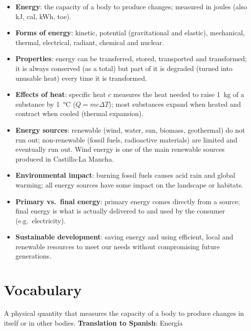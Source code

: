 \begin{itemize}
    \item \textbf{Energy}: the capacity of a body to produce changes; measured in joules (also kJ, cal, kWh, toe).
    \item \textbf{Forms of energy}: kinetic, potential (gravitational and elastic), mechanical, thermal, electrical, radiant, chemical and nuclear.
    \item \textbf{Properties}: energy can be transferred, stored, transported and transformed; it is always conserved (as a total) but part of it is degraded (turned into unusable heat) every time it is transformed.
    \item \textbf{Effects of heat}: specific heat \(c\) measures the heat needed to raise \qty{1}{\kg} of a substance by \qty{1}{\celsius} (\(Q = mc\Delta T\)); most substances expand when heated and contract when cooled (thermal expansion).
    \item \textbf{Energy sources}: renewable (wind, water, sun, biomass, geothermal) do not run out; non-renewable (fossil fuels, radioactive materials) are limited and eventually run out. Wind energy is one of the main renewable sources produced in Castilla-La Mancha.
    \item \textbf{Environmental impact}: burning fossil fuels causes acid rain and global warming; all energy sources have some impact on the landscape or habitats.
    \item \textbf{Primary vs.\ final energy}: primary energy comes directly from a source; final energy is what is actually delivered to and used by the consumer (e.g.\ electricity).
    \item \textbf{Sustainable development}: saving energy and using efficient, local and renewable resources to meet our needs without compromising future generations.
\end{itemize}

\section{Vocabulary}

\begin{vocabulary}[Energy]
    A physical quantity that measures the capacity of a body to produce changes in itself or in other bodies. \newline
    \textbf{Translation to Spanish}: Energía
\end{vocabulary}

